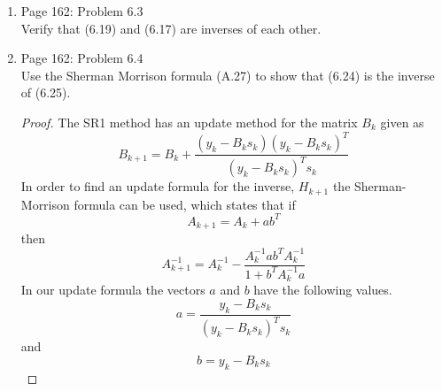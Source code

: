 \documentclass[11pt, oneside]{article}
\begin{document}
\begin{enumerate}
\begin{enumerate}
        \begin{proof}
          Consider the matrix product $\p{\M{D} \M{Q}}^T \M{A} \p{\M{D} \M{Q}}$.
          \begin{align*}
            \p{\M{D} \M{Q}}^T \M{A} \p{\M{D} \M{Q}}^T &= \M{Q}^T \M{D}^T \M{A} \M{D} \M{Q}
            \intertext{Since the columns of $\M{D}$ are $\M{A}$-conjugate}
            &= \M{Q}^T I \M{Q} \\
            &= \M{Q}^T \M{Q} \\
            \intertext{Since $\M{Q}$ is orthogonal}
            &= I
          \end{align*}
          This shows by part (a) that the columns of $\M{D} \M{Q}$ are $\M{A}$-
          conjugate.
        \end{proof}
    \end{enumerate}

  \item %
    Page 162: Problem 6.3 \\
    Verify that (6.19) and (6.17) are inverses of each other.

  \item %
    Page 162: Problem 6.4 \\
    Use the Sherman Morrison formula (A.27) to show that (6.24) is the inverse
    of (6.25).

    \begin{proof}
      The SR1 method has an update method for the matrix $B_k$ given as
      \[
        B_{k+1} = B_k + \frac{(y_k - B_ks_k)(y_k - B_ks_k)^T}{(y_k - B_ks_k)^T s_k}
      \]
      In order to find an update formula for the inverse, $H_{k+1}$ the Sherman-Morrison
      formula can be used, which states that if
      \[
        A_{k+1} = A_k + ab^T
      \]
      then
      \[
        A_{k+1}^{-1} = A_k^{-1} - \frac{A_k^{-1} ab^T A_k^{-1}}{1 + b^T A_k^{-1}a}
      \]
      In our update formula the vectors $a$ and $b$ have the following values.
      \[
        a = \frac{y_k - B_k s_k}{(y_k - B_ks_k)^T s_k}
      \]
      and
      \[
        b = y_k - B_k s_k
      \]


\end{proof}
\end{enumerate}
\end{document}
